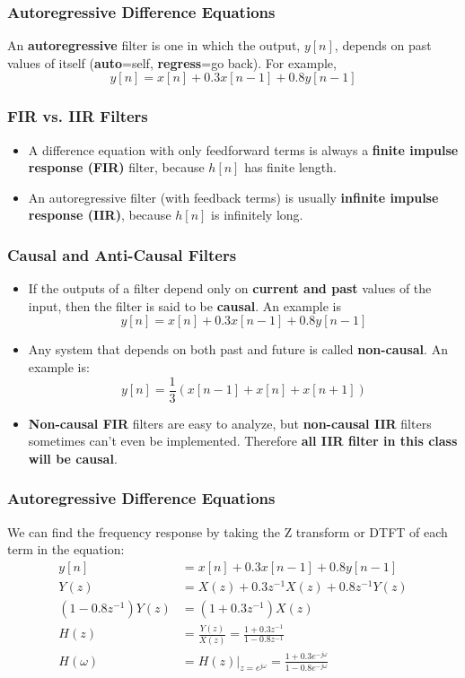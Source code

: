 \documentclass{beamer}
\begin{document}
\begin{frame}
  \frametitle{Autoregressive Difference Equations}

  An {\bf autoregressive} filter is one in which the output, $y[n]$,
  depends on past values of itself ({\bf auto}=self, {\bf
    regress}=go back).  For example,
  \[
  y[n] = x[n] + 0.3x[n-1] + 0.8 y[n-1]
  \]
  
\end{frame}

\begin{frame}
  \frametitle{FIR vs. IIR Filters}

  \begin{itemize}
  \item A difference equation with only feedforward terms is always a
    {\bf finite impulse response (FIR)} filter, because $h[n]$ has
    finite length.
  \item An autoregressive filter (with feedback terms) is usually
    \textbf{infinite impulse response (IIR)}, because $h[n]$
    is infinitely long.
  \end{itemize}
\end{frame}

\begin{frame}
  \frametitle{Causal and Anti-Causal Filters}

  \begin{itemize}
  \item If the outputs of a filter depend only on {\bf current and
    past} values of the input, then the filter is said to be {\bf
    causal}.  An example is
    \[
    y[n] = x[n] + 0.3x[n-1] + 0.8 y[n-1]
    \]
  \item Any system that depends on both past and future is called
    \textbf{non-causal}.  An example is:
    \[
    y[n] = \frac{1}{3}\left(x[n-1]+x[n]+x[n+1]\right)
    \]
  \item \textbf{Non-causal FIR} filters are easy to analyze, but
    \textbf{non-causal IIR} filters sometimes can't even be implemented.
    Therefore \textbf{all IIR filter in this class will be causal}.
  \end{itemize}
  
\end{frame}

\begin{frame}
  \frametitle{Autoregressive Difference Equations}

  We can find the frequency response by taking the Z transform or DTFT
  of each term in the equation:
  \begin{align*}
    y[n] &= x[n] + 0.3 x[n-1] +  0.8 y[n-1]\\
    Y(z) &= X(z) + 0.3z^{-1}X(z) + 0.8  z^{-1}Y(z)\\
    \left(1-0.8z^{-1}\right)Y(z) &= \left(1+0.3z^{-1}\right)X(z)\\
    H(z) &=\frac{Y(z)}{X(z)} = \frac{1+0.3z^{-1}}{1-0.8 z^{-1}}\\
    H(\omega) &= \left.H(z)\right|_{z=e^{j\omega}} = \frac{1+0.3e^{-j\omega}}{1-0.8 e^{-j\omega}}
  \end{align*}
\end{frame}
\end{document}
